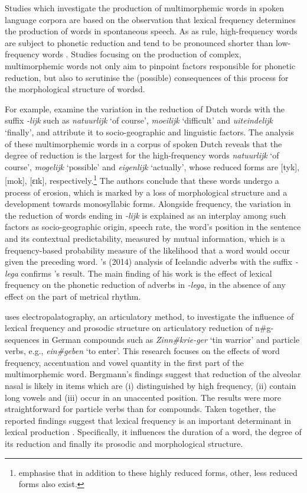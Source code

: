 Studies which investigate the production of multimorphemic words in spoken language corpora are based on the observation that lexical frequency determines the production of words in spontaneous speech. As as rule, high-frequency words are subject to phonetic reduction \citep{bybee2000} and tend to be pronounced shorter than low-frequency words \citep{jurafsky-etal2001}. Studies focusing on the production of complex, multimorphemic words not only aim to pinpoint factors responsible for phonetic reduction, but also to scrutinise the (possible) consequences of this process for the morphological structure of wordsd. 

For example, \citet{keune-etal2005} examine the  variation in the reduction of Dutch words with the suffix \textit{-lijk} such as \textit{natuurlijk} `of course', \textit{moeilijk} `difficult' and \textit{uiteindelijk} `finally', and attribute it to socio-geographic and linguistic factors. The analysis of these multimorphemic words in a corpus of spoken Dutch reveals that the degree of reduction is the largest for the high-frequency words \textit{natuurlijk} `of course',  \textit{mogelijk} `possible' and \textit{eigenlijk} `actually', whose reduced forms are [tyk], [mok], [ɛɪk], respectively.\footnote{\citeauthor{keune-etal2005} emphasise that in addition to these highly reduced forms, other, less reduced forms also exist.} The authors conclude that these words undergo a process of erosion, which is marked by a loss of morphological structure and a development towards monosyllabic forms. Alongside frequency, the variation in the reduction of words ending in \textit{-lijk} is explained as an interplay among such factors as socio-geographic origin, speech rate, the word's position in the sentence and its contextual predictability, measured by mutual information, which is a frequency-based probability measure of the likelihood that a word would occur given the preceding word. \citeauthor{schaefer2014}'s (2014) analysis of Icelandic adverbs with the suffix \textit{-lega} confirms \citeauthor{keune-etal2005}'s result. The main finding of his work is the effect of lexical frequency on the phonetic reduction of adverbs in \textit{-lega}, in the absence of any effect on the part of metrical rhythm. 

\citet{bergmann2012} uses electropalatography, an articulatory method, to investigate the influence of lexical frequency and prosodic structure on articulatory reduction of n\#g-sequences in German compounds such as \textit{Zinn\#krie-ger} `tin warrior' and particle verbs, e.g., \textit{ein\#geben} `to enter'. This research focuses on the effects of word frequency, accentuation and vowel quantity in the first part of the multimorphemic word. Bergmann's findings suggest that reduction of the alveolar nasal is likely in items which are (i) distinguished by high frequency, (ii) contain long vowels and (iii) occur in an unaccented position. The results were more straightforward for particle verbs than for compounds. Taken together, the reported findings suggest that lexical frequency is an important determinant in lexical production \citep[but see][for another interpretation]{jurafsky2003}. Specifically, it influences the duration of a word, the degree of its reduction and finally its prosodic and morphological  structure.


